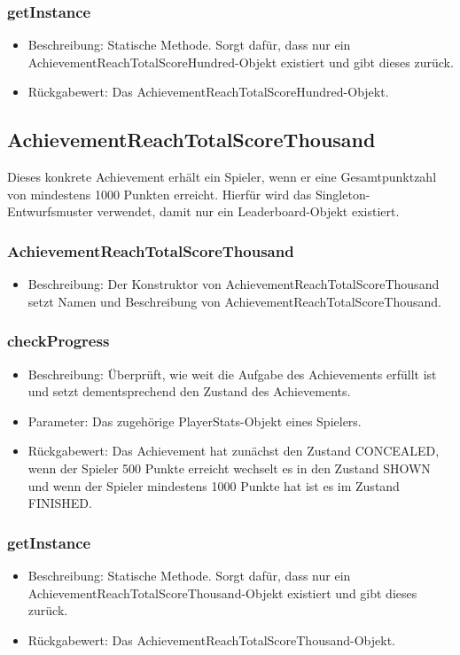 \documentclass[a4paper]{scrreprt}
\begin{document}
	\subsubsection{getInstance}
	\begin{itemize}
		\item Beschreibung: Statische Methode. Sorgt dafür, dass nur ein AchievementReachTotalScoreHundred-Objekt existiert und gibt dieses zurück.
		\item Rückgabewert: Das AchievementReachTotalScoreHundred-Objekt.
	\end{itemize}

	\subsection{AchievementReachTotalScoreThousand}
	Dieses konkrete Achievement erhält ein Spieler, wenn er eine Gesamtpunktzahl von mindestens 1000 Punkten erreicht. Hierfür wird das Singleton-Entwurfsmuster verwendet, damit nur ein Leaderboard-Objekt existiert.

	\subsubsection{AchievementReachTotalScoreThousand}
	\begin{itemize}
		\item Beschreibung: Der Konstruktor von AchievementReachTotalScoreThousand setzt Namen und Beschreibung von AchievementReachTotalScoreThousand.
	\end{itemize}
	\subsubsection{checkProgress}
	\begin{itemize}
		\item Beschreibung: Überprüft, wie weit die Aufgabe des Achievements erfüllt ist und setzt dementsprechend den Zustand des Achievements.
		\item Parameter: Das zugehörige PlayerStats-Objekt eines Spielers.
		\item Rückgabewert: Das Achievement hat zunächst den Zustand CONCEALED, wenn der Spieler 500 Punkte erreicht wechselt es in den Zustand SHOWN und wenn der Spieler mindestens 1000 Punkte hat ist es im Zustand FINISHED.
	\end{itemize}
	\subsubsection{getInstance}
	\begin{itemize}
		\item Beschreibung: Statische Methode. Sorgt dafür, dass nur ein AchievementReachTotalScoreThousand-Objekt existiert und gibt dieses zurück.
		\item Rückgabewert: Das AchievementReachTotalScoreThousand-Objekt.
	\end{itemize}
\end{document}
